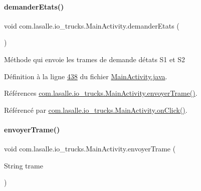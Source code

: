 \paragraph{\texorpdfstring{demander\+Etats()}{demanderEtats()}}
{\footnotesize\ttfamily void com.\+lasalle.\+io\+\_\+trucks.\+Main\+Activity.\+demander\+Etats (\begin{DoxyParamCaption}{ }\end{DoxyParamCaption})\hspace{0.3cm}{\ttfamily [private]}}

Méthode qui envoie les trames de demande d\textquotesingle{}états S1 et S2 

Définition à la ligne \hyperlink{_main_activity_8java_source_l00438}{438} du fichier \hyperlink{_main_activity_8java_source}{Main\+Activity.\+java}.



Références \hyperlink{_main_activity_8java_source_l00242}{com.\+lasalle.\+io\+\_\+trucks.\+Main\+Activity.\+envoyer\+Trame()}.



Référencé par \hyperlink{_main_activity_8java_source_l00131}{com.\+lasalle.\+io\+\_\+trucks.\+Main\+Activity.\+on\+Click()}.


\mbox{\label{classcom_1_1lasalle_1_1io__trucks_1_1_main_activity_af120db4bf132a5e3544a9e6722839a5e}} 
\paragraph{\texorpdfstring{envoyer\+Trame()}{envoyerTrame()}}
{\footnotesize\ttfamily void com.\+lasalle.\+io\+\_\+trucks.\+Main\+Activity.\+envoyer\+Trame (\begin{DoxyParamCaption}\item[{String}]{trame }\end{DoxyParamCaption})\hspace{0.3cm}{\ttfamily [private]}}



